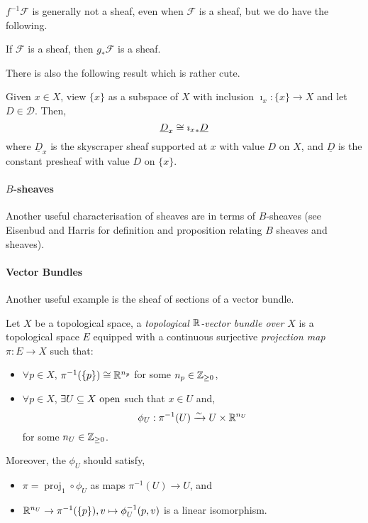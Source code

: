 \documentclass[000-main.tex]{subfiles}
\begin{document}
$f^{-1}\mathcal{F}$ is generally not a sheaf, even when $\mathcal{F}$ is a sheaf, but we do have the following.
\begin{lemma}
  If $\mathcal{F}$ is a sheaf, then $g_*\mathcal{F}$ is a sheaf.
\end{lemma}
There is also the following result which is rather cute.
\begin{lemma}
  Given $x\in X$, view $\{x\}$ as a subspace of $X$ with inclusion $\imath_x: \{x\}\to X$ and let $D\in \mathcal{D}$.
  Then,
  \begin{displaymath}
    \underline{D}_x \cong {{\imath_x}_{*}}\underline{D}
  \end{displaymath}
  where $\underline{D}_x$ is the skyscraper sheaf supported at $x$ with value $D$ on $X$, and $\underline{D}$ is the constant presheaf with value $D$ on $\{x\}$.
\end{lemma}


\paragraph{$B$-sheaves}

Another useful characterisation of sheaves are in terms of $B$-sheaves (see Eisenbud and Harris for definition and proposition relating $B$ sheaves and sheaves).

\paragraph{Vector Bundles}%

Another useful example is the sheaf of sections of a vector bundle.
\begin{definition}
  Let $X$ be a topological space, a \emph{topological $\mathbb{R}$-vector bundle over $X$} is a topological space $E$ equipped with a continuous surjective \emph{projection map} $\pi: E \to X$ such that:
  \begin{itemize}
    \item $\forall p\in X$, $\pi^{-1}(\{p\}) \cong \mathbb{R}^{n_p}$ for some $n_p\in\mathbb{Z}_{\geq0}$,
    \item $\forall p\in X$, $\exists U\subseteq X\text{ open}$ such that $x\in U$ and,
          \begin{displaymath}
            \phi_U: \pi^{-1}(U) \xrightarrow{\sim} U\times \mathbb{R}^{n_U}
          \end{displaymath}
          for some $n_U\in\mathbb{Z}_{\geq0}$.
  \end{itemize}
  Moreover, the $\phi_U$ should satisfy,
  \begin{itemize}
    \item \(\pi = \operatorname{proj}_1\circ \phi_U\) as maps $\pi^{-1}(U) \to U$, and
    \item $\mathbb{R}^{n_U}\to \pi^{-1}(\{p\}), v \mapsto \phi^{-1}_U(p, v)$ is a linear isomorphism.
  \end{itemize}
\end{definition}
\end{document}
